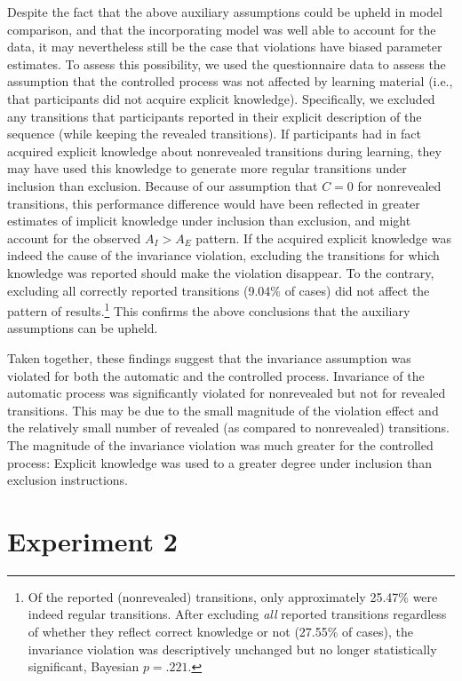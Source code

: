 \documentclass[floatsintext,man]{apa6}
\begin{document}
Despite the fact that the above auxiliary assumptions could be upheld in
model comparison, and that the incorporating model was well able to
account for the data, it may nevertheless still be the case that
violations have biased parameter estimates. To assess this possibility,
we used the questionnaire data to assess the assumption that the
controlled process was not affected by learning material (i.e., that
participants did not acquire explicit knowledge). Specifically, we
excluded any transitions that participants reported in their explicit
description of the sequence (while keeping the revealed transitions). If
participants had in fact acquired explicit knowledge about nonrevealed
transitions during learning, they may have used this knowledge to
generate more regular transitions under inclusion than exclusion.
Because of our assumption that \(C=0\) for nonrevealed transitions, this
performance difference would have been reflected in greater estimates of
implicit knowledge under inclusion than exclusion, and might account for
the observed \(A_{I}>A_{E}\) pattern. If the acquired explicit knowledge
was indeed the cause of the invariance violation, excluding the
transitions for which knowledge was reported should make the violation
disappear. To the contrary, excluding all correctly reported transitions
(9.04\% of cases) did not affect the pattern of results.\footnote{Of the
  reported (nonrevealed) transitions, only approximately 25.47\% were
  indeed regular transitions. After excluding \emph{all} reported
  transitions regardless of whether they reflect correct knowledge or
  not (27.55\% of cases), the invariance violation was descriptively
  unchanged but no longer statistically significant, Bayesian
  \(p = .221\).} This confirms the above conclusions that the auxiliary
assumptions can be upheld.

Taken together, these findings suggest that the invariance assumption
was violated for both the automatic and the controlled process.
Invariance of the automatic process was significantly violated for
nonrevealed but not for revealed transitions. This may be due to the
small magnitude of the violation effect and the relatively small number
of revealed (as compared to nonrevealed) transitions. The magnitude of
the invariance violation was much greater for the controlled process:
Explicit knowledge was used to a greater degree under inclusion than
exclusion instructions.

\section{Experiment 2}\label{experiment-2}
\end{document}
